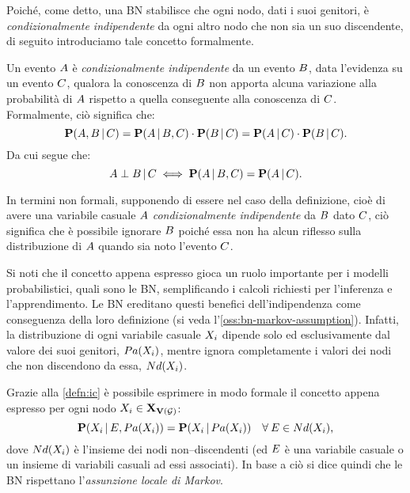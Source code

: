 Poiché, come detto, una \acl{BN} stabilisce che ogni nodo, dati i suoi genitori, è \emph{condizionalmente indipendente} da ogni altro nodo che non sia un suo discendente, di seguito introduciamo tale concetto formalmente.
\begin{definizione}\label{defn:ic}
Un evento $\mathnormal{A}$ è \emph{condizionalmente indipendente} da un evento $\mathnormal{B}$, data l'evidenza su un evento $\mathnormal{C}$, qualora la conoscenza di $\mathnormal{B}$ non apporta alcuna variazione alla probabilità di $\mathnormal{A}$ rispetto a quella conseguente alla conoscenza di $\mathnormal{C}$.
Formalmente, ciò significa che:
\[
\mathbf{P}(\mathnormal{A},\mathnormal{B}\,\arrowvert\,\mathnormal{C})=\mathbf{P}(\mathnormal{A}\,\arrowvert\,\mathnormal{B},\mathnormal{C})\cdot\mathbf{P}(\mathnormal{B}\,\arrowvert\,\mathnormal{C})=\mathbf{P}(\mathnormal{A}\,\arrowvert\,\mathnormal{C})\cdot\mathbf{P}(\mathnormal{B}\,\arrowvert\,\mathnormal{C})\text{.}
\]
Da cui segue che:
\[
\mathnormal{A}\perp\mathnormal{B}\,\arrowvert\,\mathnormal{C}\iff\mathbf{P}(\mathnormal{A}\,\arrowvert\,\mathnormal{B},\mathnormal{C})=\mathbf{P}(\mathnormal{A}\,\arrowvert\,\mathnormal{C})\text{.}
\]
\end{definizione}
In termini non formali, supponendo di essere nel caso della definizione, cioè di avere una variabile casuale $\mathnormal{A}$ \emph{condizionalmente indipendente} da $\mathnormal{B}$ dato $\mathnormal{C}$, ciò significa che è possibile ignorare $\mathnormal{B}$ poiché essa non ha alcun riflesso sulla distribuzione \cond*{} di $\mathnormal{A}$ quando sia noto l'evento $\mathnormal{C}$.

Si noti che il concetto appena espresso gioca un ruolo importante per i modelli probabilistici, quali sono le \acl{BN}, semplificando i calcoli richiesti per l'inferenza e l'apprendimento. Le \acl{BN} ereditano questi benefici dell'indipendenza \cond*{} come conseguenza della loro definizione (si veda l'\autoref{oss:bn-markov-assumption}). Infatti, la distribuzione \cond*{} di ogni variabile casuale $\mathnormal{X_i}$ dipende solo ed esclusivamente dal valore dei suoi genitori, $Pa(\mathnormal{X_i})$, mentre ignora completamente i valori dei nodi che non discendono da essa, $Nd(\mathnormal{X_i})$.

Grazie alla \autoref{defn:ic} è possibile esprimere in modo formale il concetto appena espresso per ogni nodo $\mathnormal{X_i}\in\mathbf{X}_{\mathbf{V}(\mathcal{G})}$:
\[
\mathbf{P}(\mathnormal{X_i}\,\arrowvert\,\mathnormal{E},Pa(\mathnormal{X_i}))=\mathbf{P}(\mathnormal{X_i}\,\arrowvert\,Pa(\mathnormal{X_i})) \quad \forall\:\mathnormal{E}\in Nd(\mathnormal{X_i})\text{,}
\]
dove $Nd(\mathnormal{X_i})$ è l'insieme dei nodi non--discendenti (ed $\mathnormal{E}$ è una variabile casuale o un insieme di variabili casuali ad essi associati).
In base a ciò si dice quindi che le \acl{BN} rispettano l'\emph{assunzione locale di Markov}.

